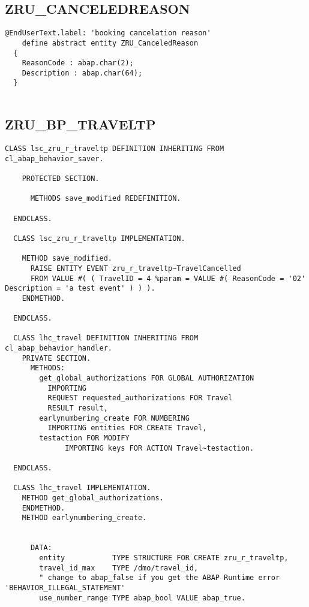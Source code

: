 \subsection{ ZRU\_CANCELEDREASON } 

\begin{Verbatim}[breaklines=true]
    @EndUserText.label: 'booking cancelation reason'
    define abstract entity ZRU_CanceledReason 
  {
    ReasonCode : abap.char(2);  
    Description : abap.char(64);
  }
  
\end{Verbatim}


\subsection{ ZRU\_BP\_TRAVELTP } 

\begin{Verbatim}[breaklines=true]
    CLASS lsc_zru_r_traveltp DEFINITION INHERITING FROM cl_abap_behavior_saver.

    PROTECTED SECTION.
  
      METHODS save_modified REDEFINITION.
  
  ENDCLASS.
  
  CLASS lsc_zru_r_traveltp IMPLEMENTATION.
  
    METHOD save_modified.
      RAISE ENTITY EVENT zru_r_traveltp~TravelCancelled
      FROM VALUE #( ( TravelID = 4 %param = VALUE #( ReasonCode = '02' Description = 'a test event' ) ) ).
    ENDMETHOD.
  
  ENDCLASS.
  
  CLASS lhc_travel DEFINITION INHERITING FROM cl_abap_behavior_handler.
    PRIVATE SECTION.
      METHODS:
        get_global_authorizations FOR GLOBAL AUTHORIZATION
          IMPORTING
          REQUEST requested_authorizations FOR Travel
          RESULT result,
        earlynumbering_create FOR NUMBERING
          IMPORTING entities FOR CREATE Travel,
        testaction FOR MODIFY
              IMPORTING keys FOR ACTION Travel~testaction.
  
  ENDCLASS.
  
  CLASS lhc_travel IMPLEMENTATION.
    METHOD get_global_authorizations.
    ENDMETHOD.
    METHOD earlynumbering_create.
  
  
      DATA:
        entity           TYPE STRUCTURE FOR CREATE zru_r_traveltp,
        travel_id_max    TYPE /dmo/travel_id,
        " change to abap_false if you get the ABAP Runtime error 'BEHAVIOR_ILLEGAL_STATEMENT'
        use_number_range TYPE abap_bool VALUE abap_true.
  

\end{Verbatim}
